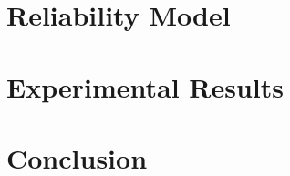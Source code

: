 \documentclass[conference]{IEEEtran}
\begin{document}
  \section{Reliability Model}
  

  \section{Experimental Results} \label{sec:results}
  

  \section{Conclusion}
  

  
\end{document}
